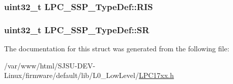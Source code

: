 \subsubsection[{\texorpdfstring{R\+IS}{RIS}}]{ uint32\+\_\+t L\+P\+C\+\_\+\+S\+S\+P\+\_\+\+Type\+Def\+::\+R\+IS}\hypertarget{structLPC__SSP__TypeDef_ac864a0884f6871821318720c8a7c06ef}{}\label{structLPC__SSP__TypeDef_ac864a0884f6871821318720c8a7c06ef}
\subsubsection[{\texorpdfstring{SR}{SR}}]{ uint32\+\_\+t L\+P\+C\+\_\+\+S\+S\+P\+\_\+\+Type\+Def\+::\+SR}\hypertarget{structLPC__SSP__TypeDef_a82edd1e82e00dbdc9db58e5173893d77}{}\label{structLPC__SSP__TypeDef_a82edd1e82e00dbdc9db58e5173893d77}


The documentation for this struct was generated from the following file\+:\begin{DoxyCompactItemize}
\item 
/var/www/html/\+S\+J\+S\+U-\/\+D\+E\+V-\/\+Linux/firmware/default/lib/\+L0\+\_\+\+Low\+Level/\hyperlink{LPC17xx_8h}{L\+P\+C17xx.\+h}\end{DoxyCompactItemize}
